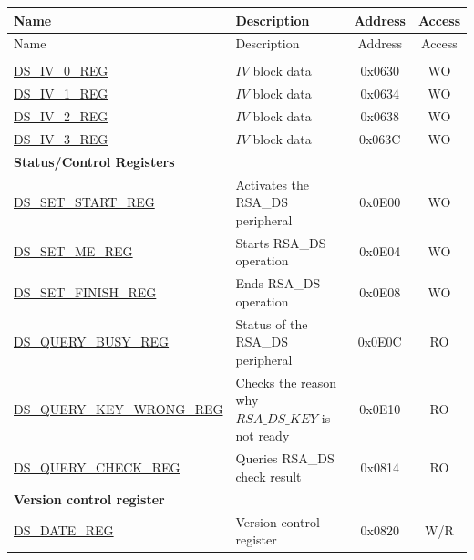 


\begin{longtable}{ | p{5.2cm} | p{6.6cm} | c| c| }
\hline\rowcolor{lightgray}
Name & Description &  Address & Access \\ \hline
\endfirsthead
        \hline
        \rowcolor{lightgray}
Name & Description &  Address & Access \\ \hline

        \endhead
        \endfoot
\multicolumn{4}{|l|}{\textbf{Configuration Registers}} \\ \hline
\hyperref[regdesc:DSIVREG]{DS\_IV\_0\_REG}               & \begin{math}IV\end{math} block data         & 0x0630 & WO \\ \hline
\hyperref[regdesc:DSIVREG]{DS\_IV\_1\_REG}               & \begin{math}IV\end{math} block data          & 0x0634 & WO \\ \hline
\hyperref[regdesc:DSIVREG]{DS\_IV\_2\_REG}               & \begin{math}IV\end{math} block data          & 0x0638 & WO \\ \hline
\hyperref[regdesc:DSIVREG]{DS\_IV\_3\_REG}               & \begin{math}IV\end{math} block data           & 0x063C & WO \\ \hline
\multicolumn{4}{|l|}{\textbf{Status/Control Registers}} \\ \hline
\hyperref[regdesc:DSSETSTARTREG]{DS\_SET\_START\_REG}               & Activates the RSA\_DS peripheral     & 0x0E00 & WO \\ \hline
\hyperref[regdesc:DSSETMEREG]{DS\_SET\_ME\_REG}                     & Starts RSA\_DS operation       & 0x0E04 & WO \\ \hline
\hyperref[regdesc:DSSETFINISHREG]{DS\_SET\_FINISH\_REG}             & Ends RSA\_DS operation         & 0x0E08 & WO \\ \hline
\hyperref[regdesc:DSQUERYBUSYREG]{DS\_QUERY\_BUSY\_REG}             & Status of the RSA\_DS peripheral & 0x0E0C & RO \\ \hline
\hyperref[regdesc:DSQUERYKEYWRONGREG]{DS\_QUERY\_KEY\_WRONG\_REG}   & Checks the reason why \begin{math}RSA\_DS\_KEY\end{math} is not ready       & 0x0E10 & RO \\ \hline
\hyperref[regdesc:DSQUERYCHECKREG]{DS\_QUERY\_CHECK\_REG}           & Queries RSA\_DS check result    & 0x0814 & RO \\ \hline
\multicolumn{4}{|l|}{\textbf{Version control register}} \\ \hline
\hyperref[regdesc:DSDATEREG]{DS\_DATE\_REG}                   & Version control register   & 0x0820 & W/R \\ \hline
\end{longtable}
